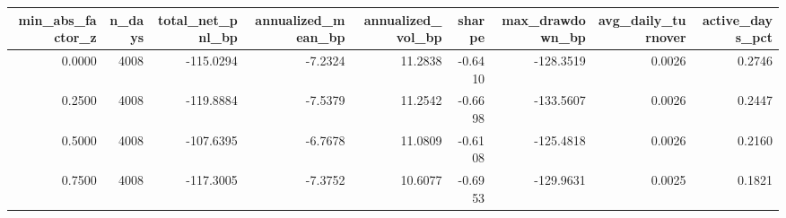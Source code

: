 \begin{tabular}{rrrrrrrrr}
\toprule
min_abs_factor_z & n_days & total_net_pnl_bp & annualized_mean_bp & annualized_vol_bp & sharpe & max_drawdown_bp & avg_daily_turnover & active_days_pct \\
\midrule
0.0000 & 4008 & -115.0294 & -7.2324 & 11.2838 & -0.6410 & -128.3519 & 0.0026 & 0.2746 \\
0.2500 & 4008 & -119.8884 & -7.5379 & 11.2542 & -0.6698 & -133.5607 & 0.0026 & 0.2447 \\
0.5000 & 4008 & -107.6395 & -6.7678 & 11.0809 & -0.6108 & -125.4818 & 0.0026 & 0.2160 \\
0.7500 & 4008 & -117.3005 & -7.3752 & 10.6077 & -0.6953 & -129.9631 & 0.0025 & 0.1821 \\
\bottomrule
\end{tabular}
